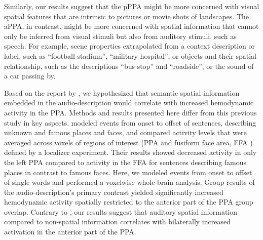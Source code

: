 \documentclass[english,11pt]{article}
\begin{document}
Similarly, our results suggest that the pPPA might be more concerned with visual
spatial features that are intrinsic to pictures or movie shots of landscapes.
The aPPA, in contrast, might be more concerned with spatial information that
cannot only be inferred from visual stimuli but also from auditory stimuli, such
as speech.
For example, scene properties extrapolated from a context description or label,
such as ``football stadium'', ``military hospital'', or objects and their
spatial relationship, such as the descriptions ``bus stop'' and ``roadside'', or
the sound of a car passing by.

Based on the report by \citet{aziz2008modulation}, we hypothesized that semantic
spatial information embedded in the audio-description would correlate with
increased hemodynamic activity in the PPA.
%
Methods and results presented here differ from this previous study in key
aspects.
\citet{aziz2008modulation} modeled events from onset to offset of sentences,
describing unknown and famous places and faces, and compared activity levels
that were averaged across voxels of regions of interest (PPA and fusiform face
area, FFA \citep{kanwisher1997ffa}) defined by a localizer experiment.
Their results showed decreased activity in only the left PPA compared to
activity in the FFA for sentences describing famous places in contrast to famous
faces.
Here, we modeled events from onset to offset of single words and performed a
voxelwise whole-brain analysis.
Group results of the audio-description's primary contrast yielded significantly
increased hemodynamic activity spatially restricted to the anterior part of the
PPA group overlap.
Contrary to \citet{aziz2008modulation}, our results suggest that auditory
spatial information compared to non-spatial information correlates with
bilaterally increased activation in the anterior part of the PPA.
\end{document}
